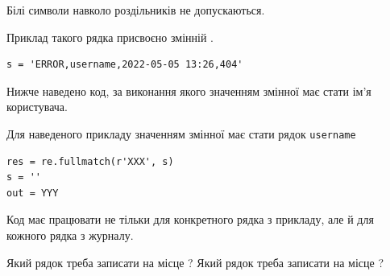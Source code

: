 \documentclass[12pt, ukrainian]{article}
\def\code#1{\Verb!#1!}
\begin{document}
{Білі символи навколо роздільників не допускаються.

Приклад такого рядка присвоєно змінній .



\begin{verbatim}
s = 'ERROR,username,2022-05-05 13:26,404'
\end{verbatim}


Нижче наведено код, за виконання якого значенням змінної  має стати ім'я користувача.

Для наведеного прикладу значенням змінної  має стати рядок \code{username}



\begin{verbatim}
res = re.fullmatch(r'XXX', s)
s = ''
out = YYY
\end{verbatim}


Код має працювати не тільки для конкретного рядка з прикладу, але й для кожного рядка з журналу.


Який рядок треба записати на місце  ?
Який рядок треба записати на місце  ?\par

}
\end{document}
